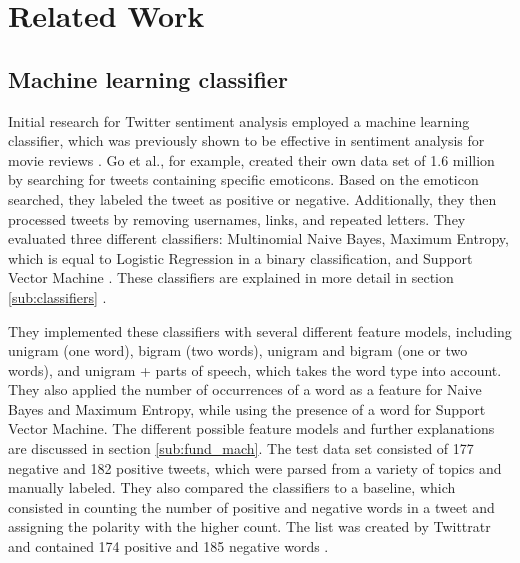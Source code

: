 \chapter{Related Work}
\label{cha:Chapter2_RelatedWork}
\iffalse

Length: 1-2 pages

Effort: ~2 weeks

2-3 Arbeiten maximal, die genauer betrachtet werden
Ruhig mehr Zitate --> aber nicht detailliert betrachten
Introduction to Data Mining --> zu generell, nur als Zitat
Hier nur im engsten Sinne


Content
\begin{itemize}
\item Alec Go, Richa Bhayani, and Lei Huang. 2009. Twitter Sentiment Classification Using Distant Supeusedrvision.
Technical Report. Standford.
\item Taboada or Serendio or Vader?
\item Khuc et al.
\end{itemize}

\fi



\section{Machine learning classifier}

Initial research for Twitter sentiment analysis employed a machine learning classifier, which was previously shown to be effective in sentiment analysis for movie reviews \cite{GoBHaHua2009}. Go et al., for example, created their own data set of 1.6 million by searching for tweets containing specific emoticons. Based on the emoticon searched, they labeled the tweet as positive or negative. Additionally, they then processed tweets by removing usernames, links, and repeated letters. They evaluated three different classifiers: Multinomial Naive Bayes, Maximum Entropy, which is equal to Logistic Regression in a binary classification, and Support Vector Machine \cite{GoBHaHua2009}. These classifiers are explained in more detail in section \ref{sub:classifiers} .

They implemented these classifiers with several different feature models, including unigram (one word), bigram (two words), unigram and bigram (one or two words), and unigram + parts of speech, which takes the word type into account. They also applied the number of occurrences of a word as a feature for Naive Bayes and Maximum Entropy, while using the presence of a word for Support Vector Machine. The different possible feature models and further explanations are discussed in section \ref{sub:fund_mach}. The test data set consisted of 177 negative and 182 positive tweets, which were parsed from a variety of topics and manually labeled. They also compared the classifiers to a baseline, which consisted in counting the number of positive and negative words in a tweet and assigning the polarity with the higher count. The list was created by Twittratr and contained 174 positive and 185 negative words \cite{GoBHaHua2009}. 

